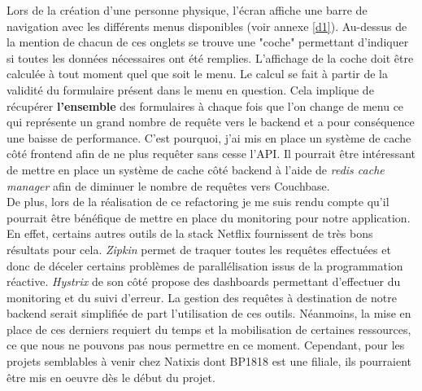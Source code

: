	Lors de la création d'une personne physique, l'écran affiche une barre de navigation avec les différents menus disponibles (voir annexe \ref{d1}). Au-dessus de la mention de chacun de ces onglets se trouve une "coche" permettant d'indiquer si toutes les données nécessaires ont été remplies. L'affichage de la coche doit être calculée à tout moment quel que soit le menu. Le calcul se fait à partir de la validité du formulaire présent dans le menu en question. Cela implique de récupérer \textbf{l'ensemble} des formulaires à chaque fois que l'on change de menu ce qui représente un grand nombre de requête vers le backend et a pour conséquence une baisse de performance. C'est pourquoi, j'ai mis en place un système de cache côté frontend afin de ne plus requêter sans cesse l'API. Il pourrait être intéressant de mettre en place un système de cache côté backend à l'aide de \textit{redis cache manager} afin de diminuer le nombre de requêtes vers Couchbase. \\
	
	De plus, lors de la réalisation de ce refactoring je me suis rendu compte qu'il pourrait être bénéfique de mettre en place du monitoring pour notre application. En effet, certains autres outils de la stack Netflix fournissent de très bons résultats pour cela. \textit{Zipkin} permet de traquer toutes les requêtes effectuées et donc de déceler certains problèmes de parallélisation issus de la programmation réactive. \textit{Hystrix} de son côté propose des dashboards permettant d'effectuer du monitoring et du suivi d'erreur. La gestion des requêtes à destination de notre backend serait simplifiée de part l'utilisation de ces outils. Néanmoins, la mise en place de ces derniers requiert du temps et la mobilisation de certaines ressources, ce que nous ne pouvons pas nous permettre en ce moment. Cependant, pour les projets semblables à venir chez Natixis dont BP1818 est une filiale, ils pourraient être mis en oeuvre dès le début du projet.